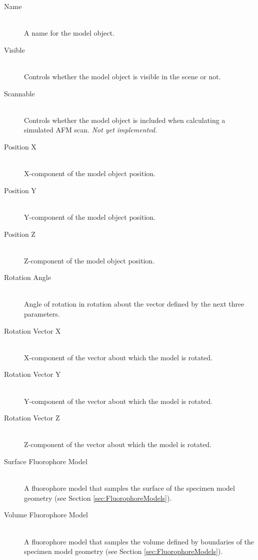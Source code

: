 \documentclass[11pt,titlepage,twoside]{article}
\begin{document}
\begin{description}

  \item[Name] \hfill \\
  A name for the model object.
  
  \item[Visible] \hfill \\
  Controls whether the model object is visible in the scene or not.

  \item[Scannable] \hfill \\
  Controls whether the model object is included when calculating a simulated AFM scan. \emph{Not yet implemented.}

  \item[Position X] \hfill \\
   X-component of the model object position.

  \item[Position Y] \hfill \\
  Y-component of the model object position.

  \item[Position Z] \hfill \\
  Z-component of the model object position.
  
  \item[Rotation Angle] \hfill \\
  Angle of rotation in rotation about the vector defined by the next three parameters.
  
  \item[Rotation Vector X] \hfill \\
  X-component of the vector about which the model is rotated.
  
  \item[Rotation Vector Y] \hfill \\
  Y-component of the vector about which the model is rotated.
  
  \item[Rotation Vector Z] \hfill \\
  Z-component of the vector about which the model is rotated.
  
  \item[Surface Fluorophore Model] \hfill \\
  A fluorophore model that samples the surface of the specimen model geometry (see Section \ref{sec:FluorophoreModels}).
  
  \item[Volume Fluorophore Model] \hfill \\
  A fluorophore model that samples the volume defined by boundaries of the specimen model geometry (see Section \ref{sec:FluorophoreModels}).

\end{description}
\end{document}
